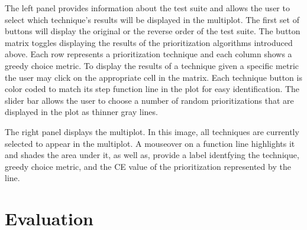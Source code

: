 \documentclass{vgtc}                          %
\begin{document}
The left panel provides information about the test suite and allows the user to select which technique's results will be displayed in the multiplot.  The first set of buttons will display the original or the reverse order of the test suite.  The button matrix toggles displaying the results of the prioritization algorithms introduced above.  Each row represents a prioritization technique and each column shows a greedy choice metric.  To display the results of a technique given a specific metric the user may click on the appropriate cell in the matrix.  Each technique button is color coded to match its step function line in the plot for easy identification.  The slider bar allows the user to choose a number of random prioritizations that are displayed in the plot as thinner gray lines.  

The right panel displays the multiplot.   In this image, all techniques are currently selected to appear in the multiplot.  A mouseover on a function line highlights it and shades the area under it, as well as, provide a label identfying the technique, greedy choice metric, and the CE value of the prioritization represented by the line.  

\section{Evaluation}

\end{document}
